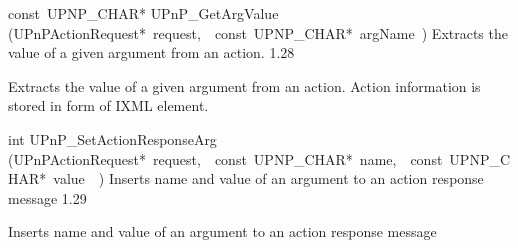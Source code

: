 \documentclass{article}
\begin{document}
\begin{cxxentry}
\begin{cxxfunction}
\begin{cxxdoc}
\end{cxxdoc}
\end{cxxfunction}
\begin{cxxfunction}
{const\ UPNP\_CHAR*}
        {UPnP\_GetArgValue}
        {(UPnPActionRequest*\ request,\ \ const\ UPNP\_CHAR*\ argName\ )}
        {Extracts the value of a given argument from an action.}
        {1.28}
\begin{cxxdoc}
Extracts the value of a given argument from an action. Action information is
stored in form of IXML element.


\end{cxxdoc}
\end{cxxfunction}
\begin{cxxfunction}
{int}
        {UPnP\_SetActionResponseArg}
        {(UPnPActionRequest*\ request,\ \ const\ UPNP\_CHAR*\ name,\ \ const\ UPNP\_CHAR*\ value\ \ )}
        {Inserts name and value of an argument to an action response message}
        {1.29}
\begin{cxxdoc}
Inserts name and value of an argument to an action response message


\end{cxxdoc}
\end{cxxfunction}
\end{cxxentry}
\end{document}
